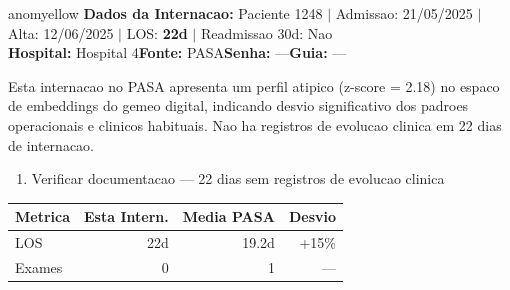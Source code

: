 \documentclass[a4paper,10pt]{article}
\begin{document}
\begin{anomalycard}[Internacao 160582 | PASA | MODERADO (z=2.18)]{anomyellow}
\textbf{Dados da Internacao:} Paciente 1248 $\mid$ Admissao: 21/05/2025 $\mid$ Alta: 12/06/2025 $\mid$ LOS: \textbf{22d} $\mid$ Readmissao 30d: Nao\\
\textbf{Hospital:} Hospital 4\quad\textbf{Fonte:} PASA\quad\textbf{Senha:} ---\quad\textbf{Guia:} ---\\
\vspace{2pt}\begin{tcolorbox}[colback=severityred!20,colframe=anomyellow,title={\textbf{Interpretacao de Negocio}},fonttitle=\bfseries\small,left=4pt,right=4pt,top=3pt,bottom=3pt]
{\small Esta internacao no PASA apresenta um perfil atipico (z-score = 2.18) no espaco de embeddings do gemeo digital, indicando desvio significativo dos padroes operacionais e clinicos habituais. Nao ha registros de evolucao clinica em 22 dias de internacao.}
\end{tcolorbox}
\begin{tcolorbox}[colback=severityyellow!30,colframe=anomorange,title={\textbf{Recomendacoes Especificas}},fonttitle=\bfseries\small,left=4pt,right=4pt,top=3pt,bottom=3pt]
\begin{enumerate}[nosep,leftmargin=16pt]
\item {\small Verificar documentacao --- 22 dias sem registros de evolucao clinica}
\end{enumerate}
\end{tcolorbox}
\begin{center}\begin{tabular}{l r r r}\toprule\textbf{Metrica} & \textbf{Esta Intern.} & \textbf{Media PASA} & \textbf{Desvio} \\\midrule
LOS & 22d & 19.2d & +15\% \\
Exames & 0 & 1 & --- \\
\bottomrule\end{tabular}\end{center}


\end{anomalycard}
\end{document}
